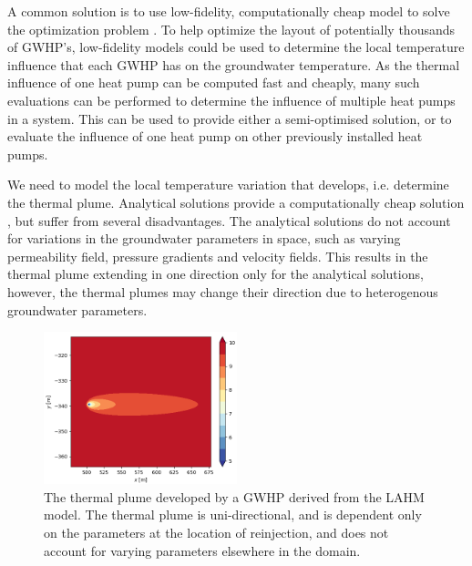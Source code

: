 \documentclass{article} %
\begin{document}
A common solution is to use low-fidelity, computationally cheap model to solve the optimization problem \cite{Sbai2019, Nagoor2019, Robinson2012}. 
To help optimize the layout of potentially thousands of GWHP's, low-fidelity models could be used to determine the local temperature influence that each GWHP has on the groundwater temperature. 
As the thermal influence of one heat pump can be computed fast and cheaply, many such evaluations can be performed to determine the influence of multiple heat pumps in a system. 
This can be used to provide either a semi-optimised solution, or to evaluate the influence of one heat pump on other previously installed heat pumps. 

We need to model the local temperature variation that develops, i.e. determine the thermal plume. 
Analytical solutions provide a computationally cheap solution \cite{Pophillat2020}, but suffer from several disadvantages. 
The analytical solutions do not account for variations in the groundwater parameters in space, such as varying permeability field, pressure gradients and velocity fields. 
This results in the thermal plume extending in one direction only for the analytical solutions, however, the thermal plumes may change their direction due to heterogenous groundwater parameters. 

\begin{figure}
\centering
\includegraphics[width=0.5\textwidth]{analyticalPlume.png}
\caption{The thermal plume developed by a GWHP derived from the LAHM model. The thermal plume is uni-directional, and is dependent only on the parameters at the location of reinjection, and does not account for varying parameters elsewhere in the domain.}
\label{analyticalPlume}
\end{figure}

\end{document}
